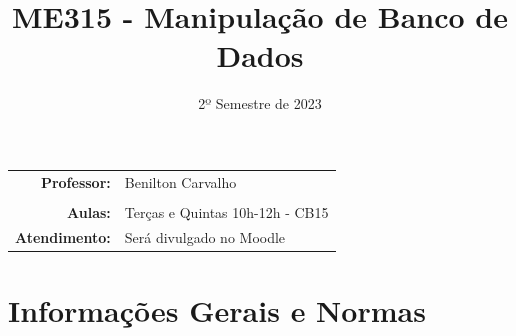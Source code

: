 \documentclass[paper=letter, fontsize=12pt]{scrartcl} %
\title{\normalfont \LARGE ME315 - Manipulação de Banco de Dados}
\subtitle{2º Semestre de 2023}
\author{}
\date{}
\begin{document}
\maketitle

\vspace{-1.5cm}

\noindent
\begin{tabular}{rl}
\textbf{Professor:} & 	 Benilton Carvalho \\
\\
\textbf{Aulas:} & Terças e Quintas 10h-12h - CB15\\
\textbf{Atendimento:} & Será divulgado no Moodle\\



\end{tabular}

\section{Informações Gerais e Normas}
\end{document}
